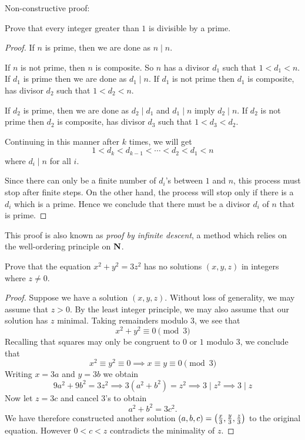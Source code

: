 Non-constructive proof:
\begin{exercise}
Prove that every integer greater than $1$ is divisible by a prime.
\end{exercise}

\begin{proof}
If $n$ is prime, then we are done as $n\mid n$.

If $n$ is not prime, then $n$ is composite. So $n$ has a divisor $d_1$ such that $1<d_1<n$. If $d_1$ is prime then we are done as $d_1\mid n$. If $d_1$ is not prime then $d_1$ is composite, has divisor $d_2$ such that $1<d_2<n$.

If $d_2$ is prime, then we are done as $d_2\mid d_1$ and $d_1\mid n$ imply $d_2\mid n$. If $d_2$ is not prime then $d_2$ is composite, has divisor $d_3$ such that $1<d_3<d_2$.

Continuing in this manner after $k$ times, we will get
\[ 1<d_k<d_{k-1}<\cdots<d_2<d_1<n \]
where $d_i\mid n$ for all $i$.

Since there can only be a finite number of $d_i$'s between $1$ and $n$, this process must stop after finite steps. On the other hand, the process will stop only if there is a $d_i$ which is a prime. Hence we conclude that there must be a divisor $d_i$ of $n$ that is prime.
\end{proof}

\begin{remark}
This proof is also known as \emph{proof by infinite descent}, a method which relies on the well-ordering principle on $\mathbf N$.
\end{remark}

\begin{exercise}
Prove that the equation $x^2+y^2=3z^2$ has no solutions $(x,y,z)$ in integers where $z\neq0$.
\end{exercise}

\begin{proof}
Suppose we have a solution $(x,y,z)$. Without loss of generality, we may assume that $z>0$. By the least integer principle, we may also assume that our solution has $z$ minimal. Taking remainders modulo $3$, we see that
\[ x^2+y^2\equiv0\pmod3 \]
Recalling that squares may only be congruent to $0$ or $1$ modulo $3$, we conclude that
\[ x^2\equiv y^2\equiv 0 \implies x \equiv y \equiv 0 \pmod 3 \]
Writing $x=3a$ and $y=3b$ we obtain
\[ 9a^2+9b^2=3z^2 \implies 3(a^2+b^2)=z^2 \implies 3\mid z^2 \implies 3\mid z \]
Now let $z=3c$ and cancel $3$'s to obtain
\[ a^2+b^2=3c^2. \]
We have therefore constructed another solution $(a,b,c)=\left(\frac{x}{3},\frac{y}{3},\frac{z}{3}\right)$ to the original equation. However $0<c<z$ contradicts the minimality of $z$.
\end{proof}

